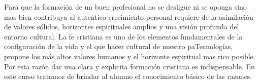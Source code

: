 \begin{syllabus}


\begin{justification}
Para que la formación de un buen profesional no se desligue ni se oponga sino mas bien contribuya al autentico crecimiento personal requiere de la asimilación de valores sólidos, horizontes espirituales amplios y una visión profunda del entorno cultural. La fe cristiana es uno de los elementos fundamentales de la configuración de la vida y el que hacer cultural de nuestro paTecnologías, propone los más altos valores humanos y el horizonte espiritual mas rico posible.
Por esta razón dar una clara y explicita formación cristiana es indispensable.  En este curso tratamos de brindar al alumno el conocimiento básico de las razones.
\end{justification}

\begin{goals}
\item \OutcomeFH
\end{goals}

\begin{outcomes}
\end{outcomes}


\end{syllabus}
